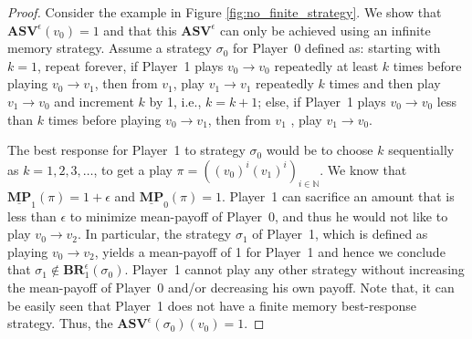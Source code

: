 \begin{proof}
Consider the example in Figure \ref{fig:no_finite_strategy}. We show that $\mathbf{ASV}^{\epsilon}(v_0) = 1$ and that this $\mathbf{ASV}^{\epsilon}$ can only be achieved using an infinite memory strategy. Assume a strategy $\sigma_0$ for Player~0 defined as: starting with $k=1$, repeat forever, if Player~1 plays $v_0 \to v_0$ repeatedly at least $k$ times before playing $v_0 \to v_1$, then from $v_1$, play $v_1 \to v_1$ repeatedly $k$ times and then play $v_1 \to v_0$ and increment $k$ by 1, i.e., $k=k+1$; else, if Player~1 plays $v_0 \to v_0$ less than $k$ times before playing $v_0 \to v_1$, then from $v_1$ , play $v_1 \to v_0$.

The best response for Player~1 to strategy $\sigma_0$ would be to choose $k$ sequentially as $k = 1, 2, 3, \dotsc$, to get a play $\pi = ((v_0)^i(v_1)^i)_{i \in \mathbb{N}}$. We know that $\underline{\mathbf{MP}}_1(\pi) = 1+\epsilon$ and $\underline{\mathbf{MP}}_0(\pi) = 1$. Player~1 can sacrifice an amount that is less than $\epsilon$ to minimize mean-payoff of Player~0, and thus he would not like to play $v_0 \to v_2$. In particular, the strategy $\sigma_1$ of Player~1, which is defined as playing $v_0 \to v_2$, yields a mean-payoff of 1 for Player~1 and hence we conclude that $\sigma_1 \notin \mathbf{BR}_1^{\epsilon}(\sigma_0)$. Player~1 cannot play any other strategy without increasing the mean-payoff of Player~0 and/or decreasing his own payoff. Note that, it can be easily seen that Player~1 does not have a finite memory best-response strategy. Thus, the $\mathbf{ASV}^{\epsilon}(\sigma_0)(v_0) = 1$.



\end{proof}
